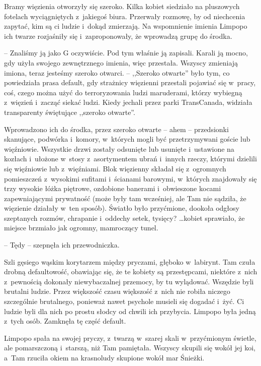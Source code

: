 \documentclass[oneside,polish,11pt,sfheadings]{mwbk}
\begin{document}
Bramy więzienia otworzyły się szeroko. Kilka kobiet siedziało na
pluszowych fotelach wyciągniętych z~jakiegoś biura. Przerwały rozmowę,
by od niechcenia zapytać, kim są ci ludzie i~dokąd zmierzają. Na
wspomnienie imienia Limpopo ich twarze rozjaśniły się i~zaproponowały,
że wprowadzą grupę do środka.

-- Znaliśmy ją jako G oczywiście. Pod tym właśnie ją zapisali. Karali ją
mocno, gdy użyła swojego zewnętrznego imienia, więc przestała. Wszyscy
zmieniają imiona, teraz jesteśmy szeroko otwarci. -- ,,Szeroko otwarte''
było tym, co powiedziała prasa default, gdy strażnicy więzienni
przestali pojawiać się w~pracy, coś, czego można użyć do terroryzowania
ludzi maruderami, którzy wybiegną z~więzień i~zacząć siekać ludzi. Kiedy
jechali przez parki TransCanada, widziała transparenty świętujące
,,szeroko otwarte''.

Wprowadzono ich do środka, przez szeroko otwarte -- ahem -- przedsionki
skanujące, podwórka i~komory, w~których mogli być przetrzymywani goście
lub więźniowie. Wszystkie drzwi zostały odsunięte lub usunięte i~ustawione na kozłach i~ułożone w~stosy z~asortymentem ubrań i~innych
rzeczy, którymi dzielili się więźniowie lub z~więźniami. Blok więzienny
składał się z~ogromnych pomieszczeń z~wysokimi sufitami i~ścianami
barowymi, w~których znajdowały się trzy wysokie łóżka piętrowe,
ozdobione banerami i~obwieszone kocami zapewniającymi prywatność (może
były tam wcześniej, ale Tam nie sądziła, że więzienie działały w~ten
sposób). Światło było przyćmione, dookoła odgłosy szeptanych rozmów,
chrapanie i~oddechy setek, tysięcy? \ldots  kobiet sprawiało, że miejsce
brzmiało jak ogromny, mamroczący tunel.

-- Tędy -- szepnęła ich przewodniczka. 

Szli gęsiego wąskim korytarzem między
pryczami, głęboko w~labirynt. Tam czuła drobną defaultowość, obawiając
się, że te kobiety są przestępcami, niektóre z~nich z~pewnością dokonały
niewybaczalnej przemocy, by tu wylądować. Wszędzie byli brutalni ludzie.
Przez większość czasu większość z~nich nie robiła niczego szczególnie
brutalnego, ponieważ nawet psychole musieli się dogadać i~żyć. Ci ludzie
byli dla nich po prostu słodcy od chwili ich przybycia. Limpopo była
jedną z~tych osób. Zamknęła tę część default.

Limpopo spała na swojej pryczy, z~twarzą w~szarej skali w~przyćmionym
świetle, ale pomarszczoną i~starszą, niż Tam pamiętała. Wszyscy skupili
się wokół jej koi, a~Tam rzuciła okiem na krasnoludy skupione wokół mar
Śnieżki.
\end{document}
